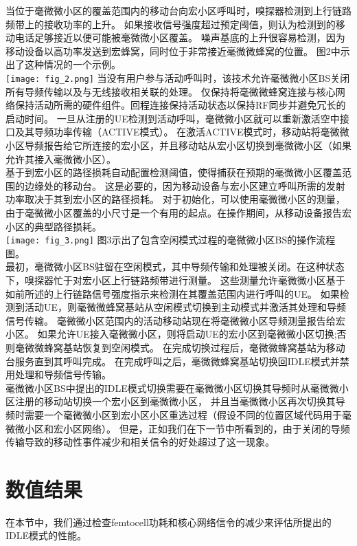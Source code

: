 \documentclass{article}
\begin{document}
当位于毫微微小区的覆盖范围内的移动台向宏小区呼叫时，嗅探器检测到上行链路频带上的接收功率的上升。
如果接收信号强度超过预定阈值，则认为检测到的移动电话足够接近以便可能被毫微微小区覆盖。
噪声基底的上升很容易检测，因为移动设备以高功率发送到宏蜂窝，同时位于非常接近毫微微蜂窝的位置。
图2中示出了这种情况的一个示例。\\
\texttt{[image: fig\_2.png]}
当没有用户参与活动呼叫时，该技术允许毫微微小区BS关闭所有导频传输以及与无线接收相关联的处理。
仅保持将毫微微蜂窝连接与核心网络保持活动所需的硬件组件。回程连接保持活动状态以保持RF同步并避免冗长的启动时间。
一旦从注册的UE检测到活动呼叫，毫微微小区就可以重新激活空中接口及其导频功率传输（ACTIVE模式）。
在激活ACTIVE模式时，移动站将毫微微小区导频报告给它所连接的宏小区，并且移动站从宏小区切换到毫微微小区（如果允许其接入毫微微小区）。\\

基于到宏小区的路径损耗自动配置检测阈值，使得捕获在预期的毫微微小区覆盖范围的边缘处的移动台。
这是必要的，因为移动设备与宏小区建立呼叫所需的发射功率取决于其到宏小区的路径损耗。
对于初始化，可以使用毫微微小区的测量，由于毫微微小区覆盖的小尺寸是一个有用的起点。在操作期间，从移动设备报告宏小区的典型路径损耗。\\
\texttt{[image: fig\_3.png]}
图3示出了包含空闲模式过程的毫微微小区BS的操作流程图。\\

最初，毫微微小区BS驻留在空闲模式，其中导频传输和处理被关闭。在这种状态下，嗅探器忙于对宏小区上行链路频带进行测量。
这些测量允许毫微微小区基于如前所述的上行链路信号强度指示来检测在其覆盖范围内进行呼叫的UE。
如果检测到活动UE，则毫微微蜂窝基站从空闲模式切换到主动模式并激活其处理和导频信号传输。
毫微微小区范围内的活动移动站现在将毫微微小区导频测量报告给宏小区。
如果允许UE接入毫微微小区，则将启动UE的宏小区到毫微微小区切换;否则毫微微蜂窝基站恢复到空闲模式。
在完成切换过程后，毫微微蜂窝基站为移动台服务直到其呼叫完成。
在完成呼叫之后，毫微微蜂窝基站切换回IDLE模式并禁用处理和导频信号传输。\\

毫微微小区BS中提出的IDLE模式切换需要在毫微微小区切换其导频时从毫微微小区注册的移动站切换一个宏小区到毫微微小区，
并且当毫微微小区再次切换其导频时需要一个毫微微小区到宏小区小区重选过程（假设不同的位置区域代码用于毫微微小区和宏小区网络）。
但是，正如我们在下一节中所看到的，由于关闭的导频传输导致的移动性事件减少和相关信令的好处超过了这一现象。\\

\section{数值结果}
在本节中，我们通过检查femtocell功耗和核心网络信令的减少来评估所提出的IDLE模式的性能。\\
\end{document}
